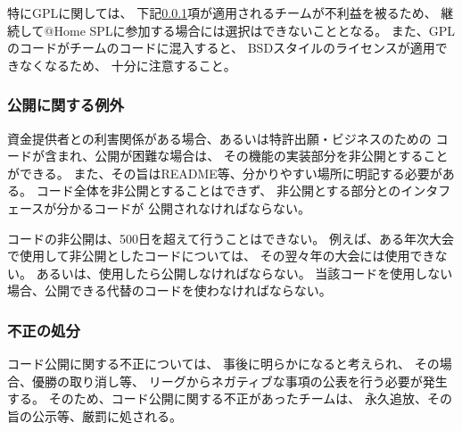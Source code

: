 \documentclass[a4j]{jarticle}
\begin{document}
特にGPLに関しては、
下記\ref{sub:licence_exception}項が適用されるチームが不利益を被るため、
継続して@Home SPLに参加する場合には選択はできないこととなる。
また、GPLのコードがチームのコードに混入すると、
BSDスタイルのライセンスが適用できなくなるため、
十分に注意すること。

\subsubsection{公開に関する例外}\label{sub:licence_exception}

資金提供者との利害関係がある場合、あるいは特許出願・ビジネスのための
コードが含まれ、公開が困難な場合は、
その機能の実装部分を非公開とすることができる。
また、その旨はREADME等、分かりやすい場所に明記する必要がある。
コード全体を非公開とすることはできず、
非公開とする部分とのインタフェースが分かるコードが
公開されなければならない。


コードの非公開は、500日を超えて行うことはできない。
例えば、ある年次大会で使用して非公開としたコードについては、
その翌々年の大会には使用できない。
あるいは、使用したら公開しなければならない。
当該コードを使用しない場合、公開できる代替のコードを使わなければならない。

\subsubsection{不正の処分}


コード公開に関する不正については、
事後に明らかになると考えられ、
その場合、優勝の取り消し等、
リーグからネガティブな事項の公表を行う必要が発生する。
そのため、コード公開に関する不正があったチームは、
永久追放、その旨の公示等、厳罰に処される。

%
\end{document}
